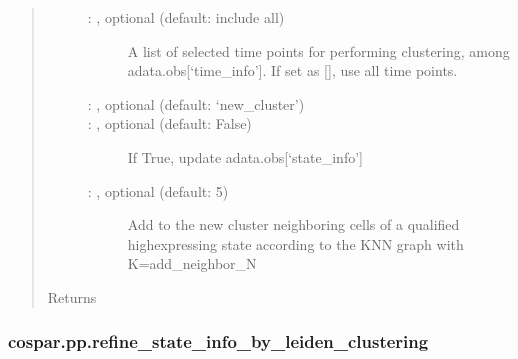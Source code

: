 \documentclass[letterpaper,10pt,english]{sphinxmanual}
\begin{document}
\begin{fulllineitems}
\begin{quote}
\begin{description}
\begin{description}
\item[{ : , optional (default: include all)}] \leavevmode
A list of selected time points for performing clustering,
among adata.obs{[}‘time\_info’{]}. If set as {[}{]}, use all time points.

\item[{ : , optional (default: ‘new\_cluster’)}] \leavevmode


\item[{ : , optional (default: False)}] \leavevmode
If True, update adata.obs{[}‘state\_info’{]}

\item[{ : , optional (default: 5)}] \leavevmode
Add to the new cluster neighboring cells of a qualified
high\sphinxhyphen{}expressing state according to the KNN graph
with K=add\_neighbor\_N

\end{description}

\item[{Returns}] \leavevmode
{}

\end{description}\end{quote}

\end{fulllineitems}



\subsubsection{cospar.pp.refine\_state\_info\_by\_leiden\_clustering}
\label{\detokenize{cospar.pp.refine_state_info_by_leiden_clustering:cospar-pp-refine-state-info-by-leiden-clustering}}\label{\detokenize{cospar.pp.refine_state_info_by_leiden_clustering::doc}}
\end{document}
